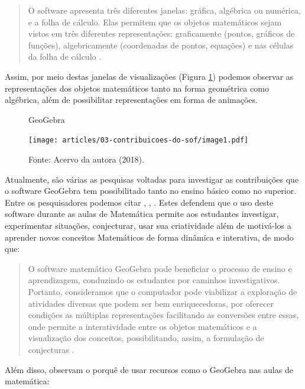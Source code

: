 \begin{refsection}
    \begin{quotation}
        O software apresenta três diferentes janelas: gráfica, algébrica ou numérica, e a folha de cálculo. Elas permitem que os objetos matemáticos sejam vistos em três diferentes representações: graficamente (pontos, gráficos de funções), algebricamente (coordenadas de pontos, equações) e nas células da folha de cálculo \cite[p.~7020]{LOPESAndOLIVEIRAAndAMORIM2013uso}. 
    \end{quotation}

    Assim, por meio destas janelas de visualizações (Figura \ref{fig:geogebra-wind}) podemos observar as representações dos objetos matemáticos tanto na forma geométrica como algébrica, além de possibilitar representações em forma de animações.

    \begin{figure}[ht]%
        \centering%
        \caption{GeoGebra}%
        \texttt{[image: articles/03-contribuicoes-do-sof/image1.pdf]}%
        \caption*{Fonte: Acervo da autora (2018).}%
        \label{fig:geogebra-wind}%
    \end{figure}%

    Atualmente, são várias as pesquisas voltadas para investigar as contribuições que o software GeoGebra tem possibilitado tanto no ensino básico como no superior. Entre os pesquisadores podemos citar \textcite{REISAndOZDEMIR2010UsingGeogebra}, \textcite{SHADAANAndEU2013Effec}, \textcite{BORBAAndPENTEADO2007Informática}. Estes defendem que o uso deste software durante as aulas de Matemática permite aos estudantes investigar, experimentar situações, conjecturar, usar sua criatividade além de motivá-los a aprender novos conceitos Matemáticos de forma dinâmica e interativa, de modo que:

    \begin{quotation}
        O software matemático GeoGebra pode beneficiar o processo de ensino e aprendizagem, conduzindo os estudantes por caminhos investigativos. Portanto, consideramos que o computador pode viabilizar a exploração de atividades diversas que podem ser bem enriquecedoras, por oferecer condições as múltiplas representações facilitando as conversões entre essas, onde permite a interatividade entre os objetos matemáticos e a visualização dos conceitos, possibilitando, assim, a formulação de conjecturas \cite[p.~201]{ARAUJOAndSILVA2015GeoGebra}. 
    \end{quotation}

    Além disso, \textcite[p.~571, tradução nossa]{REISAndOZDEMIR2010UsingGeogebra} observam o porquê de usar recursos como o GeoGebra nas aulas de matemática:  


\end{refsection}
